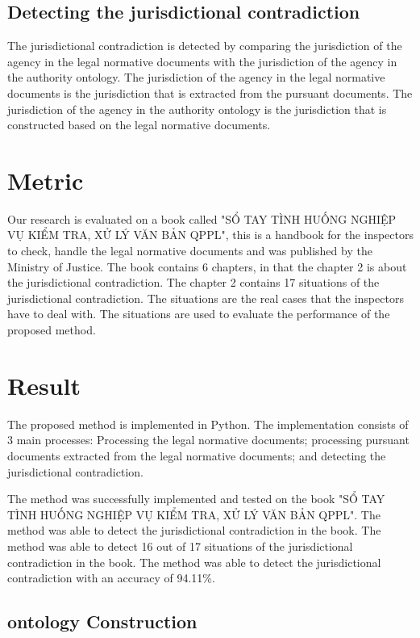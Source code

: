 \begin{algorithm}
\subsection{Detecting the jurisdictional contradiction}

The jurisdictional contradiction is detected by comparing the jurisdiction of the agency in the legal normative documents with the jurisdiction of the agency in the authority ontology. The jurisdiction of the agency in the legal normative documents is the jurisdiction that is extracted from the pursuant documents. The jurisdiction of the agency in the authority ontology is the jurisdiction that is constructed based on the legal normative documents.

\section{Metric}

Our research is evaluated on a book called "SỔ TAY TÌNH HUỐNG NGHIỆP VỤ KIỂM TRA, XỬ LÝ VĂN BẢN QPPL", this is a handbook for the inspectors to check, handle the legal normative documents and was published by the Ministry of Justice. The book contains 6 chapters, in that the chapter 2 is about the jurisdictional contradiction. The chapter 2 contains 17 situations of the jurisdictional contradiction. The situations are the real cases that the inspectors have to deal with. The situations are used to evaluate the performance of the proposed method.

\section{Result}

The proposed method is implemented in Python. The implementation consists of 3 main processes: Processing the legal normative documents; processing pursuant documents extracted from the legal normative documents; and detecting the jurisdictional contradiction.

The method was successfully implemented and tested on the book "SỔ TAY TÌNH HUỐNG NGHIỆP VỤ KIỂM TRA, XỬ LÝ VĂN BẢN QPPL". The method was able to detect the jurisdictional contradiction in the book. The method was able to detect 16 out of 17 situations of the jurisdictional contradiction in the book. The method was able to detect the jurisdictional contradiction with an accuracy of 94.11\%.

\subsection{ontology Construction}


\end{algorithm}
